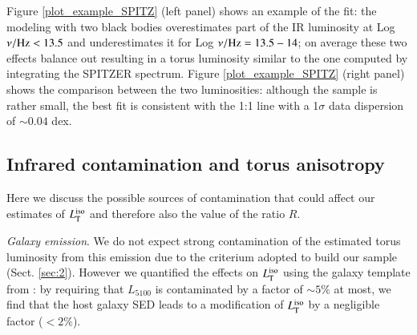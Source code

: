\documentclass[]{aa}
\begin{document}
Figure \ref{plot_example_SPITZ} (left panel) shows an example of the fit: the modeling with two black bodies overestimates part of the IR luminosity at Log $\nu/ {\rm Hz} < 13.5$ and underestimates it for Log $\nu/ {\rm Hz} = 13.5 - 14$; on average these two effects balance out resulting in a torus luminosity similar to the one computed by integrating the SPITZER spectrum. Figure \ref{plot_example_SPITZ} (right panel) shows the comparison between the two luminosities: although the sample is rather small, the best fit is consistent with the 1:1 line with a 1$\sigma$ data dispersion of $\sim 0.04$ dex.







\subsection{Infrared contamination and torus anisotropy} \label{cavoT}

Here we discuss the possible sources of contamination that could affect our estimates of $L^{\rm iso}_{\rm T}$ and therefore also the value of the ratio $R$.
	
\textit{Galaxy emission}. We do not expect strong contamination of the estimated torus luminosity from this emission due to the criterium adopted to build our sample (Sect. \ref{sec:2}). However we quantified the effects on $L^{\rm iso}_{\rm T}$ using the galaxy template from \citet{Manuc}: by requiring that $L_{5100}$ is contaminated by a factor of $\sim 5 \%$ at most, we find that the host galaxy SED leads to a modification of $L^{\rm iso}_{\rm T}$ by a negligible factor ($< 2 \%$).
\end{document}
